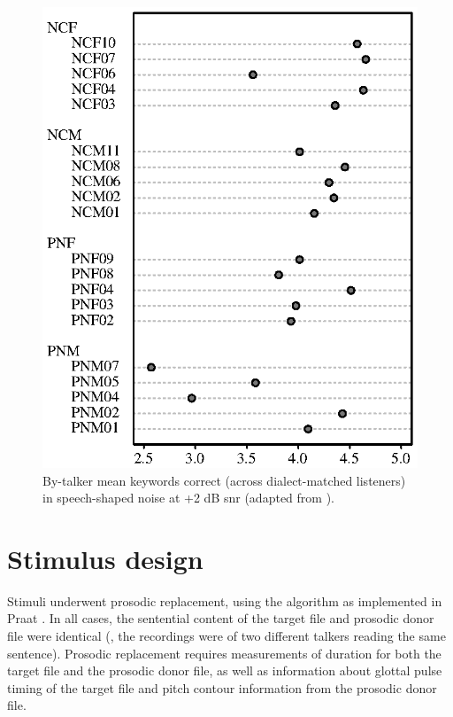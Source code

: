 \begin{figure}
	\begin{centering}
	\includegraphics{figures/dotchart.eps}
	\caption[Intelligibility of talkers used to make the stimuli]{By-talker mean keywords correct (across dialect-matched listeners) in speech-shaped noise at +2 dB \ac{snr} (adapted from \citet{McCloyEtAl2013}).\label{fig:dotchart}}
	\end{centering}
\end{figure}

\section{Stimulus design\label{sec:StimDesign}}
Stimuli underwent prosodic replacement, using the \psola{} algorithm as implemented in Praat \citep{praat}.  In all cases, the sentential content of the target file and prosodic donor file were identical (\ie, the recordings were of two different talkers reading the same sentence).  Prosodic replacement requires measurements of duration for both the target file and the prosodic donor file, as well as information about glottal pulse timing of the target file and pitch contour information from the prosodic donor file.

